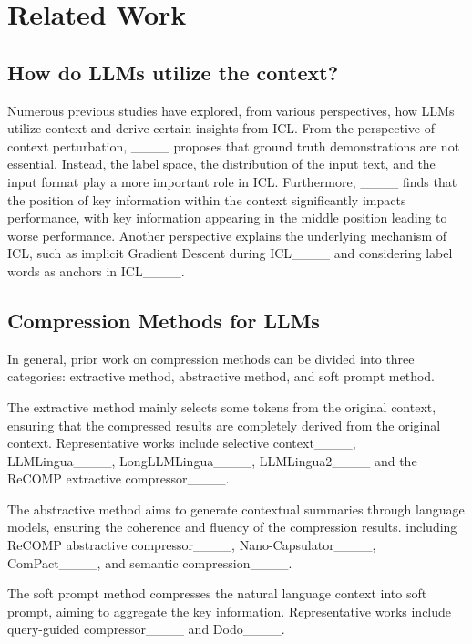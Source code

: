 \section{Related Work}
\subsection{How do LLMs utilize the context?}
Numerous previous studies have explored, from various perspectives, how LLMs utilize context and derive certain insights from ICL. From the perspective of context perturbation, ____ proposes that ground truth demonstrations are not essential. Instead, the label space, the distribution of the input text, and the input format play a more important role in ICL. Furthermore, ____ finds that the position of key information within the context significantly impacts performance, with key information appearing in the middle position leading to worse performance. Another perspective explains the underlying mechanism of ICL, such as implicit Gradient Descent during ICL____ and considering label words as anchors in ICL____.
\subsection{Compression Methods for LLMs}
In general, prior work on compression methods can be divided into three categories: extractive method, abstractive method, and soft prompt %
method. 

The extractive method mainly selects some tokens 
from the original context, ensuring that the compressed results are completely derived from the original context. 
Representative works include selective context____, LLMLingua____, LongLLMLingua____, LLMLingua2____ and the ReCOMP extractive compressor____. 

The abstractive method aims to generate contextual summaries through language models, ensuring the coherence and fluency of the compression results. 
including ReCOMP abstractive compressor____, Nano-Capsulator____, ComPact____, and semantic compression____.

The soft prompt 
method compresses the natural language context into soft prompt, %
aiming to aggregate the key information. Representative works include query-guided compressor____ and Dodo____.